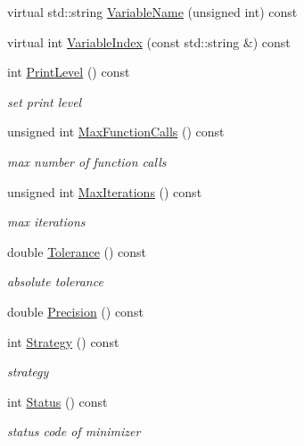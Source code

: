 \begin{DoxyCompactItemize}
virtual std\+::string \mbox{\hyperlink{classROOT_1_1Math_1_1Minimizer_a4d6a3c9c95608b35a25f16afd50690ad}{Variable\+Name}} (unsigned int) const
\item 
virtual int \mbox{\hyperlink{classROOT_1_1Math_1_1Minimizer_a5f7ff3bdda1f4b1d9e5e1150091a86c5}{Variable\+Index}} (const std\+::string \&) const
\item 
int \mbox{\hyperlink{classROOT_1_1Math_1_1Minimizer_ae6c76dc2f3073f19edf22561866c2f9c}{Print\+Level}} () const
\begin{DoxyCompactList}\small\item\em set print level \end{DoxyCompactList}\item 
unsigned int \mbox{\hyperlink{classROOT_1_1Math_1_1Minimizer_a0d7f60c2e5b240258d32feed547b30a3}{Max\+Function\+Calls}} () const
\begin{DoxyCompactList}\small\item\em max number of function calls \end{DoxyCompactList}\item 
unsigned int \mbox{\hyperlink{classROOT_1_1Math_1_1Minimizer_a472e2b4a5d108a378f6905d67c680afc}{Max\+Iterations}} () const
\begin{DoxyCompactList}\small\item\em max iterations \end{DoxyCompactList}\item 
double \mbox{\hyperlink{classROOT_1_1Math_1_1Minimizer_a038755fd3252d054a3bec59f3f008621}{Tolerance}} () const
\begin{DoxyCompactList}\small\item\em absolute tolerance \end{DoxyCompactList}\item 
double \mbox{\hyperlink{classROOT_1_1Math_1_1Minimizer_a10c2c6ff21d1946c61639678435bbf4b}{Precision}} () const
\item 
int \mbox{\hyperlink{classROOT_1_1Math_1_1Minimizer_a7b2a1a1947d6cc627f4753424b77f881}{Strategy}} () const
\begin{DoxyCompactList}\small\item\em strategy \end{DoxyCompactList}\item 
int \mbox{\hyperlink{classROOT_1_1Math_1_1Minimizer_a634833b3a6e525ef10605de5fd051499}{Status}} () const
\begin{DoxyCompactList}\small\item\em status code of minimizer \end{DoxyCompactList}\item 

\end{DoxyCompactItemize}

